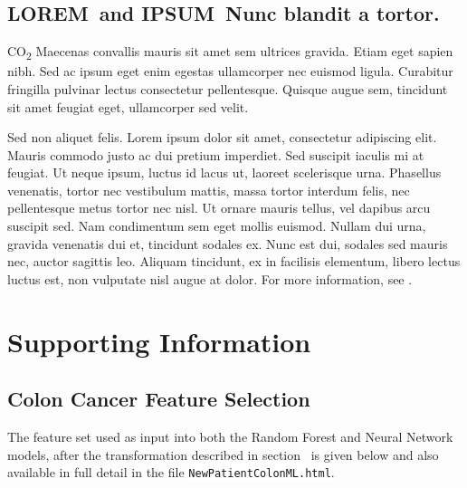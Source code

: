 \documentclass[10pt,letterpaper]{article}
\newcommand{\lorem}{{\bf LOREM}}
\newcommand{\ipsum}{{\bf IPSUM}}
\newcommand{\codewhite}[1]{\colorbox{white}{\texttt{#1}}}
\begin{document}
\subsection*{\lorem\ and \ipsum\ Nunc blandit a tortor.}

CO\textsubscript{2} Maecenas convallis mauris sit amet sem ultrices gravida. Etiam eget sapien nibh. Sed ac ipsum eget enim egestas ullamcorper nec euismod ligula. Curabitur fringilla pulvinar lectus consectetur pellentesque. Quisque augue sem, tincidunt sit amet feugiat eget, ullamcorper sed velit. 

Sed non aliquet felis. Lorem ipsum dolor sit amet, consectetur adipiscing elit. Mauris commodo justo ac dui pretium imperdiet. Sed suscipit iaculis mi at feugiat. Ut neque ipsum, luctus id lacus ut, laoreet scelerisque urna. Phasellus venenatis, tortor nec vestibulum mattis, massa tortor interdum felis, nec pellentesque metus tortor nec nisl. Ut ornare mauris tellus, vel dapibus arcu suscipit sed. Nam condimentum sem eget mollis euismod. Nullam dui urna, gravida venenatis dui et, tincidunt sodales ex. Nunc est dui, sodales sed mauris nec, auctor sagittis leo. Aliquam tincidunt, ex in facilisis elementum, libero lectus luctus est, non vulputate nisl augue at dolor. For more information, see .

\section*{Supporting Information}

\subsection*{Colon Cancer Feature Selection}
\label{Colon_Cancer_Feature_Selection}


The feature set used as input into both the Random Forest and Neural Network models, after the transformation described in section~ is given below and also available in full detail in the file 
\codewhite{NewPatientColonML.html}.
\end{document}
